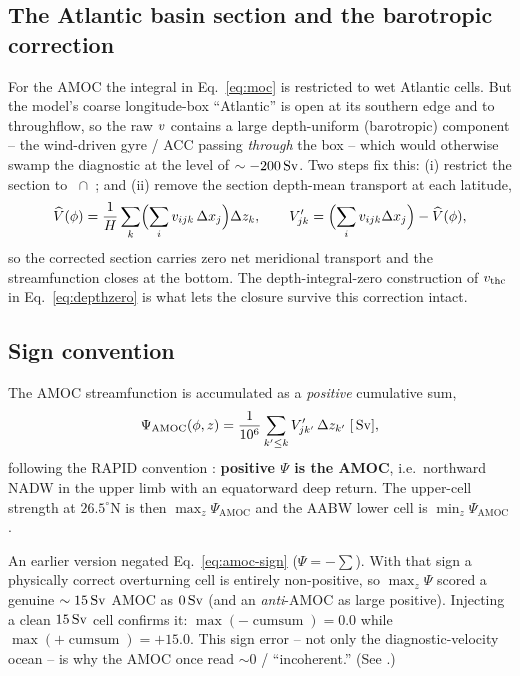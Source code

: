 \subsection{The Atlantic basin section and the barotropic correction}

For the AMOC the integral in Eq.~\eqref{eq:moc} is restricted to wet Atlantic
cells. But the model's coarse longitude-box ``Atlantic'' is open at its southern
edge and to throughflow, so the raw $v$ contains a large depth-uniform
(barotropic) component -- the wind-driven gyre / ACC passing \emph{through} the box --
which would otherwise swamp the diagnostic at the level of $\sim-200\,\mathrm{Sv}$. Two
steps fix this: (i) restrict the section to ~$\cap$~;
and (ii) remove the section depth-mean transport at each latitude,
\begin{equation}
  \widehat{V}(\phi) = \frac{1}{H}\sum_{k}\Bigl(\sum_i v_{ijk}\,\Delta x_j\Bigr)\Delta z_k,
  \qquad
  V'_{jk} = \Bigl(\sum_i v_{ijk}\Delta x_j\Bigr) - \widehat{V}(\phi),
  \label{eq:barotropic}
\end{equation}
so the corrected section carries zero net meridional transport and the
streamfunction closes at the bottom. The depth-integral-zero construction of
$v_{\mathrm{thc}}$ in Eq.~\eqref{eq:depthzero} is what lets the closure survive this
correction intact.

\subsection{Sign convention}

The AMOC streamfunction is accumulated as a \emph{positive} cumulative sum,
\begin{equation}
  \Psi_{\mathrm{AMOC}}(\phi,z) = \frac{1}{10^{6}}\sum_{k'\le k} V'_{jk'}\,\Delta z_{k'} \;[\,\mathrm{Sv}],
  \label{eq:amoc-sign}
\end{equation}
following the RAPID convention \citep{smeed2018}: \textbf{positive $\Psi$ is the AMOC}, i.e.\ northward
NADW in the upper limb with an equatorward deep return. The upper-cell strength at
$26.5^{\circ}\mathrm{N}$ is then $\max_z \Psi_{\mathrm{AMOC}}$ and the AABW lower
cell is $\min_z \Psi_{\mathrm{AMOC}}$.

\begin{remark}
An earlier version negated Eq.~\eqref{eq:amoc-sign} ($\Psi=-\!\sum$). With that
sign a physically correct overturning cell is entirely non-positive, so
$\max_z\Psi$ scored a genuine $\sim15\,\mathrm{Sv}$ AMOC as $0\,\mathrm{Sv}$ (and an \emph{anti}-AMOC
as large positive). Injecting a clean $15\,\mathrm{Sv}$ cell confirms it:
$\max(-\!\operatorname{cumsum})=0.0$ while $\max(+\!\operatorname{cumsum})=+15.0$.
This sign error -- not only the diagnostic-velocity ocean -- is why the AMOC once
read $\sim0$ / ``incoherent.'' (See .)
\end{remark}

